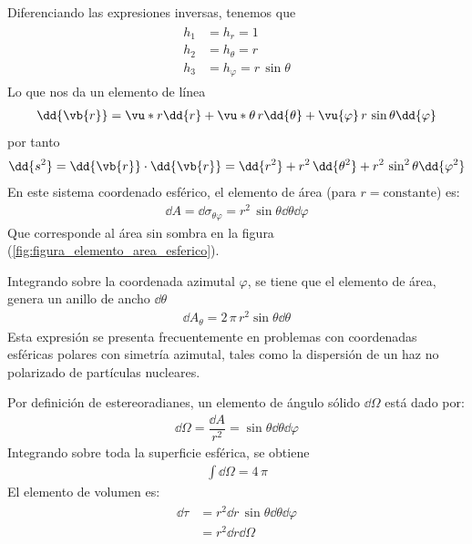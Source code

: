 Diferenciando las expresiones inversas, tenemos que 
\begin{align}
\begin{aligned}
h_{1} &= h_{r} = 1 \\
h_{2} &= h_{\theta} = r \\
h_{3} &= h_{\varphi} = r \, \sin \theta 
\end{aligned}
\label{eq:ecuacion_02_039}
\end{align}
Lo que nos da un elemento de línea
\begin{align*}
\dd{\vb{r}} = \vu*{r} \dd{r} + \vu*{\theta} \, r \dd{\theta} + \vu{\varphi} \, r \, \sin \theta \dd{\varphi}
\end{align*}
por tanto
\begin{align*}
\dd{s^{2}} = \dd{\vb{r}} \cdot \dd{\vb{r}} =  \dd{r^{2}} + r^{2} \, \dd{\theta^{2}} + r^{2} \, \sin^{2} \theta \dd{\varphi^{2}}
\end{align*}
En este sistema coordenado esférico, el elemento de área (para $r=\text{constante}$) es:
\begin{align*}
\dd{A} = \dd{\sigma_{\theta \varphi}} = r^{2} \, \sin \theta \dd{\theta} \dd{\varphi}
\end{align*}
Que corresponde al área sin sombra en la figura (\ref{fig:figura_elemento_area_esferico}).
\par
Integrando sobre la coordenada azimutal $\varphi$, se tiene que el elemento de área, genera un anillo de ancho $\dd{{\theta}}$
\begin{align*}
\dd{A_{\theta}} = 2 \, \pi \, r^{2} \sin \theta \dd{\theta}
\end{align*}
Esta expresión se presenta frecuentemente en problemas con coordenadas esféricas polares con simetría azimutal, tales como la dispersión de un haz no polarizado de partículas nucleares.
\par
Por definición de estereoradianes, un elemento de ángulo sólido $\dd{\Omega}$ está dado por:
\begin{align*}
\dd{\Omega} = \dfrac{\dd{A}}{r^{2}} = \sin \theta \dd{\theta} \dd{\varphi}
\end{align*}
Integrando sobre toda la superficie esférica, se obtiene
\begin{align*}
\int \dd{\Omega} = 4 \, \pi
\end{align*}
El elemento de volumen es:
\begin{align}
\begin{aligned}
\dd{\tau} &= r^{2} \dd{r} \, \sin \theta \dd{\theta} \dd{\varphi} \\
&= r^{2} \dd{r} \dd{\Omega}
\end{aligned}
\label{eq:ecuacion_02_043}
\end{align}
